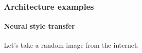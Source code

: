 \documentclass[9pt]{beamer}
\begin{document}
\begin{frame}
  \frametitle{Architecture examples}

  \framesubtitle{Neural style transfer}

  Let's take a random image from the internet.

  \begin{center}
  \end{center}
\end{frame}
\end{document}
